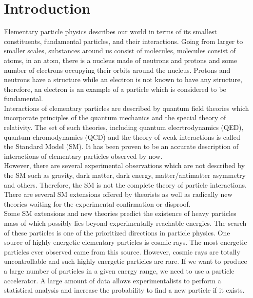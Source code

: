\section{Introduction}
\label{sec:intro}


Elementary particle physics describes our world in terms of its smallest constituents, fundamental particles, and their interactions. Going from larger to smaller scales, substances around us consist of molecules, molecules consist of atoms, in an atom, there is a nucleus made of neutrons and protons and some number of electrons occupying their orbits around the nucleus. Protons and neutrons have a structure while an electron is not known to have any structure, therefore, an electron is an example of a particle which is considered to be fundamental.\\

Interactions of elementary particles are described by quantum field theories which incorporate principles of the quantum mechanics and the special theory of relativity. The set of such theories, including quantum elecrtrodynamics (QED), quantum chromodynamics (QCD) and the theory of weak interactions is called the Standard Model (SM). It has been proven to be an accurate description of interactions of elementary particles observed by now.\\ 

However, there are several experimental observations which are not described by the SM such as gravity, dark matter, dark energy, matter/antimatter asymmetry and others. Therefore, the SM is not the complete theory of particle interactions. There are several SM extensions offered by theorists as well as radically new theories waiting for the experimental confirmation or disproof. \\

Some SM extensions and new theories predict the existence of heavy particles mass of which possibly lies beyond experimentally reachable energies. The search of these particles is one of the prioritized directions in particle physics. One source of highly energetic elementary particles is cosmic rays. The most energetic particles ever observed came from this source. However, cosmic rays are totally uncontrollable and such highly energetic particles are rare. If we want to produce a large number of particles in a given energy range, we need to use a particle accelerator. A large amount of data allows experimentalists to perform a statistical analysis and increase the probability to find a new particle if it exists.\\


